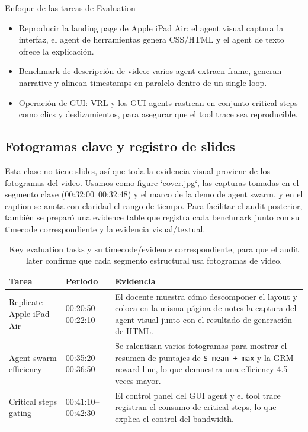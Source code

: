 \documentclass[a4paper]{article}
\begin{document}
\begin{knowledgebox}{Enfoque de las tareas de Evaluation}
\begin{itemize}
    \item Reproducir la landing page de Apple iPad Air: el agent visual captura la interfaz, el agent de herramientas genera CSS/HTML y el agent de texto ofrece la explicación.
    \item Benchmark de descripción de video: varios agent extraen frame, generan narrative y alinean timestamps en paralelo dentro de un single loop.
    \item Operación de GUI: VRL y los GUI agents rastrean en conjunto critical steps como clics y deslizamientos, para asegurar que el tool trace sea reproducible.
\end{itemize}
\end{knowledgebox}

\subsection{Fotogramas clave y registro de slides}
Esta clase no tiene slides, así que toda la evidencia visual proviene de los fotogramas del video. Usamos como figure `cover.jpg`, las capturas tomadas en el segmento clave (00:32:00~00:32:48) y el marco de la demo de agent swarm, y en el caption se anota con claridad el rango de tiempo. Para facilitar el audit posterior, también se preparó una evidence table que registra cada benchmark junto con su timecode correspondiente y la evidencia visual/textual.

\begin{table}[H]
\footnotesize
\centering
\begin{tabular}{p{3cm}p{4cm}p{5cm}}
\toprule
Tarea & Periodo & Evidencia \\
\midrule
Replicate Apple iPad Air & 00:20:50--00:22:10 & El docente muestra cómo descomponer el layout y coloca en la misma página de notes la captura del agent visual junto con el resultado de generación de HTML. \\
Agent swarm efficiency & 00:35:20--00:36:50 & Se ralentizan varios fotogramas para mostrar el resumen de puntajes de \texttt{S mean + max} y la GRM reward line, lo que demuestra una efficiency 4.5 veces mayor. \\
Critical steps gating & 00:41:10--00:42:30 & El control panel del GUI agent y el tool trace registran el consumo de critical steps, lo que explica el control del bandwidth. \\
\bottomrule
\end{tabular}
\caption{Key evaluation tasks y su timecode/evidence correspondiente, para que el audit later confirme que cada segmento estructural usa fotogramas de video.}
\end{table}
\end{document}
